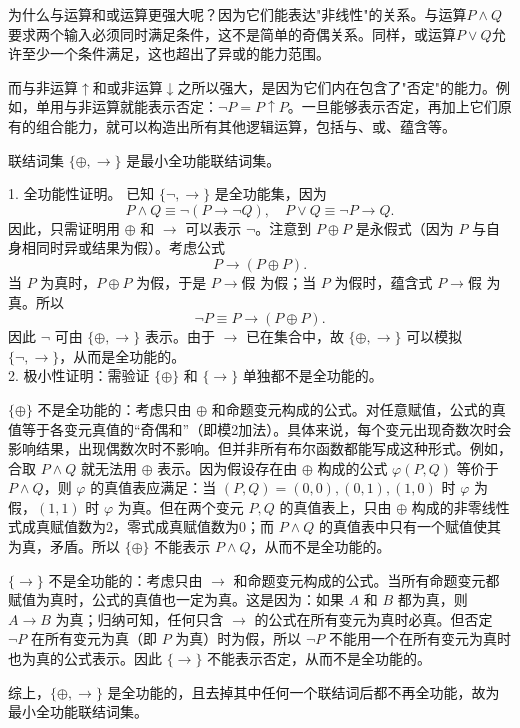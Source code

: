 为什么与运算和或运算更强大呢？因为它们能表达"非线性"的关系。与运算$P \land Q$要求两个输入必须同时满足条件，这不是简单的奇偶关系。同样，或运算$P \lor Q$允许至少一个条件满足，这也超出了异或的能力范围。

而与非运算$\uparrow$和或非运算$\downarrow$之所以强大，是因为它们内在包含了"否定"的能力。例如，单用与非运算就能表示否定：$\neg P = P \uparrow P$。一旦能够表示否定，再加上它们原有的组合能力，就可以构造出所有其他逻辑运算，包括与、或、蕴含等。
\begin{example}{}{}
联结词集 $\{\oplus, \rightarrow\}$ 是最小全功能联结词集。
\end{example}
\begin{solution}
1. 全功能性证明。
已知 $\{\neg, \rightarrow\}$ 是全功能集，因为
\[
P \land Q \equiv \neg(P \rightarrow \neg Q), \quad
P \lor Q \equiv \neg P \rightarrow Q.
\]
因此，只需证明用 $\oplus$ 和 $\rightarrow$ 可以表示 $\neg$。注意到 $P \oplus P$ 是永假式（因为 $P$ 与自身相同时异或结果为假）。考虑公式
\[
P \rightarrow (P \oplus P).
\]
当 $P$ 为真时，$P \oplus P$ 为假，于是 $P \rightarrow \text{假}$ 为假；当 $P$ 为假时，蕴含式 $P \rightarrow \text{假}$ 为真。所以
\[
\neg P \equiv P \rightarrow (P \oplus P).
\]
因此 $\neg$ 可由 $\{\oplus, \rightarrow\}$ 表示。由于 $\rightarrow$ 已在集合中，故 $\{\oplus, \rightarrow\}$ 可以模拟 $\{\neg, \rightarrow\}$，从而是全功能的。
\\2. 极小性证明：需验证 $\{\oplus\}$ 和 $\{\rightarrow\}$ 单独都不是全功能的。

$\{\oplus\}$ 不是全功能的：考虑只由 $\oplus$ 和命题变元构成的公式。对任意赋值，公式的真值等于各变元真值的“奇偶和”（即模2加法）。具体来说，每个变元出现奇数次时会影响结果，出现偶数次时不影响。但并非所有布尔函数都能写成这种形式。例如，合取 $P \land Q$ 就无法用 $\oplus$ 表示。因为假设存在由 $\oplus$ 构成的公式 $\varphi(P,Q)$ 等价于 $P \land Q$，则 $\varphi$ 的真值表应满足：当 $(P,Q)=(0,0),(0,1),(1,0)$ 时 $\varphi$ 为假，$(1,1)$ 时 $\varphi$ 为真。但在两个变元 $P,Q$ 的真值表上，只由 $\oplus$ 构成的非零线性式成真赋值数为2，零式成真赋值数为0；而 $P \land Q$ 的真值表中只有一个赋值使其为真，矛盾。所以 $\{\oplus\}$ 不能表示 $P \land Q$，从而不是全功能的。

 $\{\rightarrow\}$ 不是全功能的：考虑只由 $\rightarrow$ 和命题变元构成的公式。当所有命题变元都赋值为真时，公式的真值也一定为真。这是因为：如果 $A$ 和 $B$ 都为真，则 $A \rightarrow B$ 为真；归纳可知，任何只含 $\rightarrow$ 的公式在所有变元为真时必真。但否定 $\neg P$ 在所有变元为真（即 $P$ 为真）时为假，所以 $\neg P$ 不能用一个在所有变元为真时也为真的公式表示。因此 $\{\rightarrow\}$ 不能表示否定，从而不是全功能的。

综上，$\{\oplus, \rightarrow\}$ 是全功能的，且去掉其中任何一个联结词后都不再全功能，故为最小全功能联结词集。
\end{solution}
